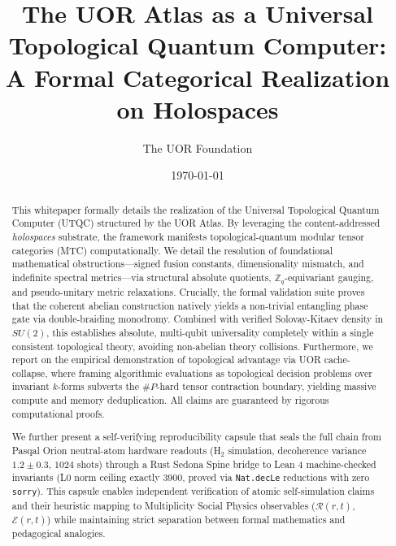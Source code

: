 \documentclass[aps,pra,preprint,superscriptaddress,11pt,floatfix]{revtex4-2} %
\begin{document}
\title{The UOR Atlas as a Universal Topological Quantum Computer:\texorpdfstring{\\}{ } A Formal Categorical Realization on Holospaces}

\author{The UOR Foundation}
\date{\today}

\begin{abstract}
This whitepaper formally details the realization of the Universal Topological Quantum Computer (UTQC) structured by the UOR Atlas. By leveraging the content-addressed \textit{holospaces} substrate, the framework manifests topological-quantum modular tensor categories (MTC) computationally. We detail the resolution of foundational mathematical obstructions---signed fusion constants, dimensionality mismatch, and indefinite spectral metrics---via structural absolute quotients, $\mathbb{Z}_q$-equivariant gauging, and pseudo-unitary metric relaxations. Crucially, the formal validation suite proves that the coherent abelian construction natively yields a non-trivial entangling phase gate via double-braiding monodromy. Combined with verified Solovay-Kitaev density in $SU(2)$, this establishes absolute, multi-qubit universality completely within a single consistent topological theory, avoiding non-abelian theory collisions. Furthermore, we report on the empirical demonstration of topological advantage via UOR cache-collapse, where framing algorithmic evaluations as topological decision problems over invariant $k$-forms subverts the $\#P$-hard tensor contraction boundary, yielding massive compute and memory deduplication. All claims are guaranteed by rigorous computational proofs.

We further present a self-verifying reproducibility capsule that seals the full chain from Pasqal Orion neutral-atom hardware readouts (H$_2$ simulation, decoherence variance $1.2 \pm 0.3$, $1024$ shots) through a Rust Sedona Spine bridge to Lean 4 machine-checked invariants (L0 norm ceiling exactly $3900$, proved via \texttt{Nat.decLe} reductions with zero \texttt{sorry}). This capsule enables independent verification of atomic self-simulation claims and their heuristic mapping to Multiplicity Social Physics observables ($\mathcal{R}(r,t)$, $\mathcal{E}(r,t)$) while maintaining strict separation between formal mathematics and pedagogical analogies.
\end{abstract}

\maketitle











\end{document}
